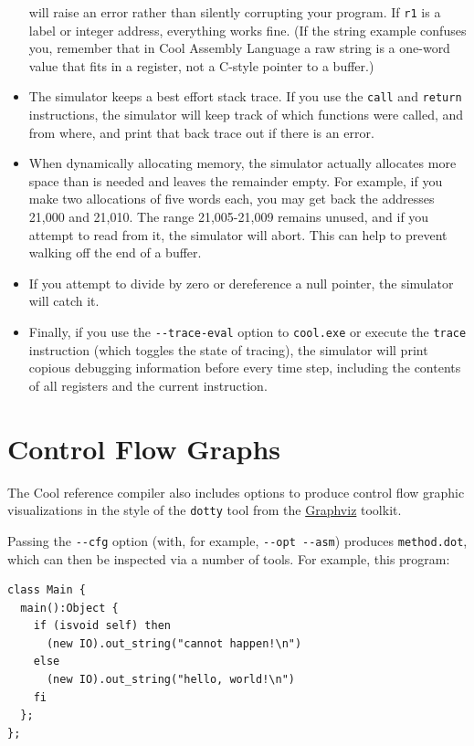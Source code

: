 \documentclass[]{article}
\begin{document}
\begin{itemize}
  will raise an error rather than silently corrupting your program. If
  \texttt{r1} is a label or integer address, everything works fine. (If
  the string example confuses you, remember that in Cool Assembly
  Language a raw string is a one-word value that fits in a register, not
  a C-style pointer to a buffer.)
\item
  The simulator keeps a best effort stack trace. If you use the
  \texttt{call} and \texttt{return} instructions, the simulator will
  keep track of which functions were called, and from where, and print
  that back trace out if there is an error.
\item
  When dynamically allocating memory, the simulator actually allocates
  more space than is needed and leaves the remainder empty. For example,
  if you make two allocations of five words each, you may get back the
  addresses 21,000 and 21,010. The range 21,005-21,009 remains unused,
  and if you attempt to read from it, the simulator will abort. This can
  help to prevent walking off the end of a buffer.
\item
  If you attempt to divide by zero or dereference a null pointer, the
  simulator will catch it.
\item
  Finally, if you use the \texttt{-{}-trace-eval} option to
  \texttt{cool.exe} or execute the \texttt{trace} instruction (which
  toggles the state of tracing), the simulator will print copious
  debugging information before every time step, including the contents
  of all registers and the current instruction.
\end{itemize}

\section{Control Flow Graphs}

The Cool reference compiler also includes options to produce control
flow graphic visualizations in the style of the \texttt{dotty} tool from
the \href{http://en.wikipedia.org/wiki/Graphviz}{Graphviz} toolkit.

Passing the \texttt{-{}-cfg} option (with, for example,
\texttt{-{}-opt -{}-asm}) produces \texttt{method.dot}, which can then
be inspected via a number of tools. For example, this program:

\begin{verbatim}
class Main {
  main():Object {
    if (isvoid self) then  
      (new IO).out_string("cannot happen!\n")
    else 
      (new IO).out_string("hello, world!\n")
    fi 
  };
};
\end{verbatim}
\end{document}
